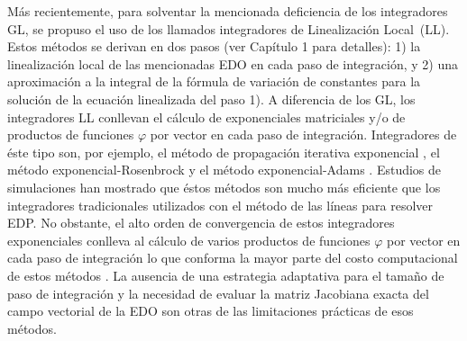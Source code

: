 Más recientemente, para solventar la mencionada deficiencia de los integradores GL, se propuso el uso de los llamados integradores de Linealización Local~(LL). Estos métodos se derivan en dos pasos (ver Capítulo 1 para detalles): 1) la linealización local de las mencionadas EDO en cada paso de integración, y 2) una aproximación a la integral de la fórmula de variación de constantes para la solución de la ecuación linealizada del paso 1). A diferencia de los GL, los integradores LL conllevan el cálculo de exponenciales matriciales y/o de productos de funciones $\varphi$ por vector en cada paso de integración. Integradores de éste tipo son, por ejemplo, el método de propagación iterativa exponencial \cite{tokman2006efficient}, el método exponencial-Rosenbrock \cite{hochbruck2009exponential} y el método exponencial-Adams \cite{hochbruck2011exponential}. Estudios de simulaciones han mostrado que éstos métodos son mucho más eficiente que los integradores tradicionales utilizados con el método de las líneas para resolver EDP. No obstante, el alto orden de convergencia de estos integradores exponenciales conlleva al cálculo de varios productos de funciones $\varphi$ por vector en cada paso de integración lo que conforma la mayor parte  del costo computacional de estos métodos \cite{naranjo2021locally}. La ausencia de una estrategia adaptativa para el tamaño de paso de integración y la necesidad de evaluar la matriz Jacobiana exacta del campo vectorial de la EDO son otras de las limitaciones prácticas de esos métodos.


